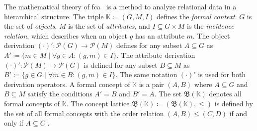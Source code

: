 The mathematical theory of \ac{fca}~\cite{fca-book} is a method to analyze relational data in a hierarchical structure.
The triple $\mathbb{K} \coloneq (G, M, I)$ defines the \emph{formal context}.
$G$ is the set of \emph{objects}, $M$ is the set of \emph{attributes},
and $I \subseteq G \times M$ is the \emph{incidence relation}, which describes when an object $g$ has an attribute $m$.
The object derivation $(\cdot)' : \mathcal{P}(G) \to \mathcal{P}(M)$
defines for any subset $A \subseteq G $ as $A' \coloneq \{m \in M \mid \forall g \in A : (g, m) \in I\}$.
The attribute derivation $(\cdot)' : \mathcal{P}(M) \to \mathcal{P}(G)$ is
defined for any subset $B \subseteq M $ as $B' \coloneq \{g \in G \mid \forall m \in B : (g, m) \in I\}$.
The same notation $(\cdot)'$ is used for both derivation operators.
A formal concept of $\mathbb{K}$ is a pair $(A, B)$ where $A \subseteq G$ and $B \subseteq M$
satisfy the conditions $A' = B$ and $B' = A$.
The set $\mathfrak{B}(\mathbb{K})$ denotes all formal concepts of $\mathbb{K}$.
The concept lattice $\underline{\mathfrak{B}}(\mathbb{K}) \coloneq (\mathfrak{B}(\mathbb{K}), \leq)$ is defined by the set of all formal concepts with the order relation
$(A, B) \leq (C, D)$ if and only if $A \subseteq C$ \cite{gutekunst2025conceptual}.

